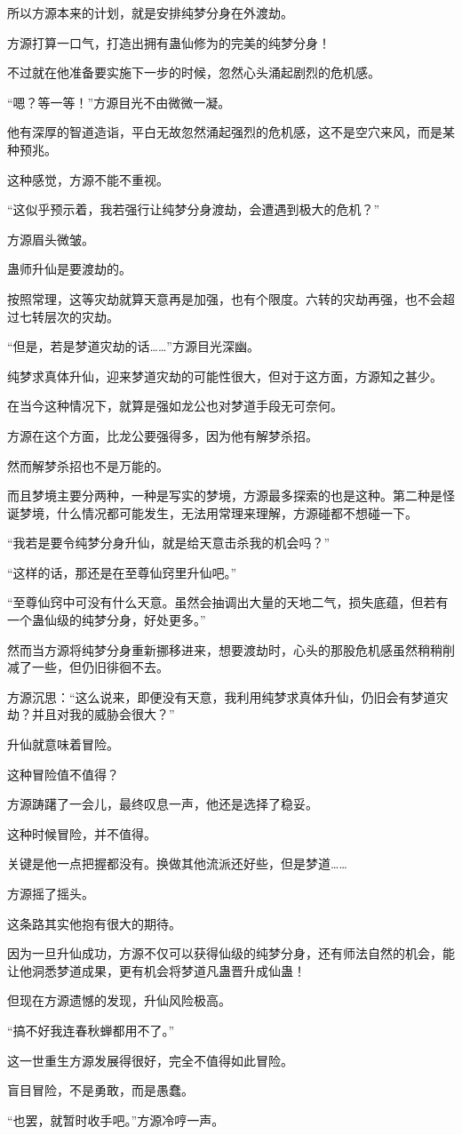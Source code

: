 \begin{this_body}
所以方源本来的计划，就是安排纯梦分身在外渡劫。

方源打算一口气，打造出拥有蛊仙修为的完美的纯梦分身！

不过就在他准备要实施下一步的时候，忽然心头涌起剧烈的危机感。

“嗯？等一等！”方源目光不由微微一凝。

他有深厚的智道造诣，平白无故忽然涌起强烈的危机感，这不是空穴来风，而是某种预兆。

这种感觉，方源不能不重视。

“这似乎预示着，我若强行让纯梦分身渡劫，会遭遇到极大的危机？”

方源眉头微皱。

蛊师升仙是要渡劫的。

按照常理，这等灾劫就算天意再是加强，也有个限度。六转的灾劫再强，也不会超过七转层次的灾劫。

“但是，若是梦道灾劫的话……”方源目光深幽。

纯梦求真体升仙，迎来梦道灾劫的可能性很大，但对于这方面，方源知之甚少。

在当今这种情况下，就算是强如龙公也对梦道手段无可奈何。

方源在这个方面，比龙公要强得多，因为他有解梦杀招。

然而解梦杀招也不是万能的。

而且梦境主要分两种，一种是写实的梦境，方源最多探索的也是这种。第二种是怪诞梦境，什么情况都可能发生，无法用常理来理解，方源碰都不想碰一下。

“我若是要令纯梦分身升仙，就是给天意击杀我的机会吗？”

“这样的话，那还是在至尊仙窍里升仙吧。”

“至尊仙窍中可没有什么天意。虽然会抽调出大量的天地二气，损失底蕴，但若有一个蛊仙级的纯梦分身，好处更多。”

然而当方源将纯梦分身重新挪移进来，想要渡劫时，心头的那股危机感虽然稍稍削减了一些，但仍旧徘徊不去。

方源沉思：“这么说来，即便没有天意，我利用纯梦求真体升仙，仍旧会有梦道灾劫？并且对我的威胁会很大？”

升仙就意味着冒险。

这种冒险值不值得？

方源踌躇了一会儿，最终叹息一声，他还是选择了稳妥。

这种时候冒险，并不值得。

关键是他一点把握都没有。换做其他流派还好些，但是梦道……

方源摇了摇头。

这条路其实他抱有很大的期待。

因为一旦升仙成功，方源不仅可以获得仙级的纯梦分身，还有师法自然的机会，能让他洞悉梦道成果，更有机会将梦道凡蛊晋升成仙蛊！

但现在方源遗憾的发现，升仙风险极高。

“搞不好我连春秋蝉都用不了。”

这一世重生方源发展得很好，完全不值得如此冒险。

盲目冒险，不是勇敢，而是愚蠢。

“也罢，就暂时收手吧。”方源冷哼一声。

\end{this_body}

